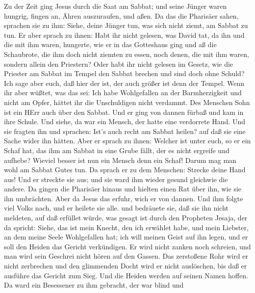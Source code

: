  Zu der Zeit ging Jesus durch die Saat am Sabbat; und seine
Jünger waren hungrig, fingen an, Ähren auszuraufen, und aßen.
 Da das die Pharisäer sahen, sprachen sie zu ihm: Siehe,
deine Jünger tun, was sich nicht ziemt, am Sabbat zu tun. 
Er aber sprach zu ihnen: Habt ihr nicht gelesen, was David tat, da ihn
und die mit ihm waren, hungerte,  wie er in das Gotteshaus
ging und aß die Schaubrote, die ihm doch nicht ziemten zu essen, noch
denen, die mit ihm waren, sondern allein den Priestern? 
Oder habt ihr nicht gelesen im Gesetz, wie die Priester am Sabbat im
Tempel den Sabbat brechen und sind doch ohne Schuld?  Ich
sage aber euch, daß hier der ist, der auch größer ist denn der Tempel.
 Wenn ihr aber wüßtet, was das sei: Ich habe Wohlgefallen an
der Barmherzigkeit und nicht am Opfer, hättet ihr die Unschuldigen nicht
verdammt.  Des Menschen Sohn ist ein HErr auch über den
Sabbat.  Und er ging von dannen fürbaß und kam in ihre
Schule.  Und siehe, da war ein Mensch, der hatte eine
verdorrete Hand. Und sie fragten ihn und sprachen: Ist's auch recht am
Sabbat heilen? auf daß sie eine Sache wider ihn hätten. 
Aber er sprach zu ihnen: Welcher ist unter euch, so er ein Schaf hat,
das ihm am Sabbat in eine Grube fällt, der es nicht ergreife und
aufhebe?  Wieviel besser ist nun ein Mensch denn ein Schaf!
Darum mag man wohl am Sabbat Gutes tun.  Da sprach er zu
dem Menschen: Strecke deine Hand aus! Und er streckte sie aus; und sie
ward ihm wieder gesund gleichwie die andere.  Da gingen die
Pharisäer hinaus und hielten einen Rat über ihn, wie sie ihn umbrächten.
 Aber da Jesus das erfuhr, wich er von dannen. Und ihm
folgte viel Volks nach, und er heilete sie alle.  und
bedräuete sie, daß sie ihn nicht meldeten,  auf daß
erfüllet würde, was gesagt ist durch den Propheten Jesaja, der da
spricht:  Siehe, das ist mein Knecht, den ich erwählet
habe, und mein Liebster, an dem meine Seele Wohlgefallen hat; ich will
meinen Geist auf ihn legen, und er soll den Heiden das Gericht
verkündigen.  Er wird nicht zanken noch schreien, und man
wird sein Geschrei nicht hören auf den Gassen.  Das
zerstoßene Rohr wird er nicht zerbrechen und den glimmenden Docht wird
er nicht auslöschen, bis daß er ausführe das Gericht zum Sieg.
 Und die Heiden werden auf seinen Namen hoffen.
 Da ward ein Besessener zu ihm gebracht, der war blind und
